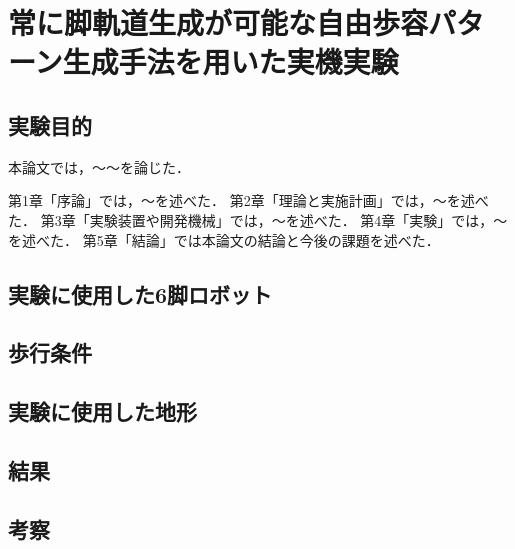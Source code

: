 ﻿%

\chapter{常に脚軌道生成が可能な自由歩容パターン生成手法を用いた実機実験}\label{chapter:常に脚軌道生成が可能な自由歩容パターン生成手法を用いた実機実験}

\section{実験目的}

本論文では，～～を論じた．

第1章「序論」では，～を述べた．
第2章「理論と実施計画」では，～を述べた．
第3章「実験装置や開発機械」では，～を述べた．
第4章「実験」では，～を述べた．
第5章「結論」では本論文の結論と今後の課題を述べた．

\section{実験に使用した6脚ロボット}


\section{歩行条件}

\section{実験に使用した地形}

\section{結果}

\section{考察}